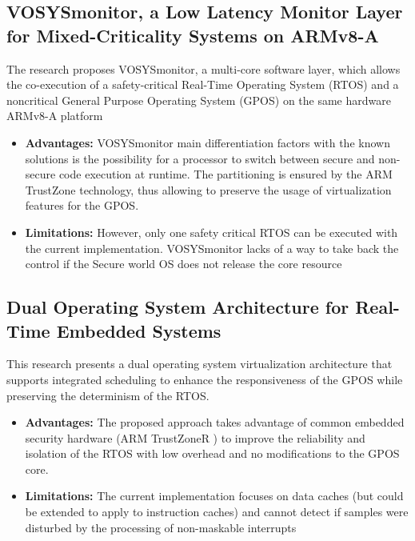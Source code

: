 \documentclass[conference]{IEEEtran}
\begin{document}
\subsection{VOSYSmonitor, a Low Latency Monitor Layer for Mixed-Criticality Systems on ARMv8-A}
\cite{hyper10} The research proposes VOSYSmonitor, a multi-core software layer, which allows the co-execution of a safety-critical Real-Time Operating System (RTOS) and a noncritical General Purpose Operating System (GPOS) on the same hardware ARMv8-A platform
\begin{itemize}
    \item \textbf{Advantages:} VOSYSmonitor main differentiation factors with the known solutions is the possibility for a processor to switch between secure and non-secure code execution at runtime. The partitioning is ensured by the ARM TrustZone technology, thus allowing to preserve the usage of virtualization features for the GPOS.
    \item \textbf{Limitations:} However, only one safety critical RTOS can be executed with the current implementation. VOSYSmonitor lacks of a way to take back the control if the Secure world OS does not release the core resource
\end{itemize}


\subsection{Dual Operating System Architecture for Real-Time Embedded Systems}
\cite{hyper11} This research presents a dual operating system virtualization architecture that supports integrated scheduling to enhance the responsiveness of the GPOS while preserving the determinism of the RTOS.
\begin{itemize}
    \item \textbf{Advantages:} The proposed approach takes advantage of common embedded security hardware (ARM TrustZoneR ) to improve the reliability and isolation of the RTOS with low overhead and no modifications to the GPOS core.
    \item \textbf{Limitations:} The current implementation focuses on data caches (but could be extended to apply to instruction caches) and cannot detect if samples were disturbed by the processing of non-maskable interrupts
\end{itemize}
\end{document}
